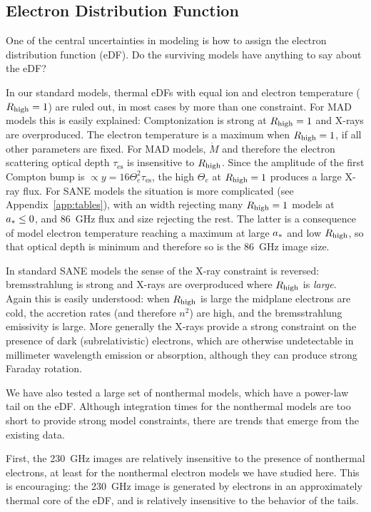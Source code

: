 \subsection{Electron Distribution Function}

One of the central uncertainties in modeling \sgra is how to assign the electron distribution function (eDF).  Do the surviving models have anything to say about the eDF?

In our standard models, thermal eDFs with equal ion and electron temperature ($R_\mathrm{high} = 1$) are ruled out, in most cases by more than one constraint.  For MAD models this is easily explained: Comptonization is strong at $R_\mathrm{high} = 1$ and X-rays are overproduced.  The electron temperature is a maximum when $R_\mathrm{high} = 1$, if all other parameters are fixed. For MAD models, $\dot{M}$ and therefore the electron scattering optical depth $\tau_\mathrm{es}$ is insensitive to $R_\mathrm{high}$.  Since the amplitude of the first Compton bump is $\propto y = 16 \Theta_e^2 \tau_\mathrm{es}$, the high $\Theta_e$ at $R_\mathrm{high} = 1$ produces a large X-ray flux.  For SANE models the situation is more complicated (see Appendix~\ref{app:tables}), with an \mring width rejecting many $R_\mathrm{high} = 1$ models at $a_* \le 0$, and 86~GHz flux and size rejecting the rest.  The latter is a consequence of model electron temperature reaching a maximum at large $a_*$ and low $R_\mathrm{high}$, so that optical depth is minimum and therefore so is the 86~GHz image size.

In standard SANE models the sense of the X-ray constraint is reversed: bremsstrahlung is strong and X-rays are overproduced where $R_\mathrm{high}$ is {\em large}.  Again this is easily understood: when $R_\mathrm{high}$ is large the midplane electrons are cold, the accretion rates (and therefore $n^2$) are high, and the bremsstrahlung emissivity is large.  More generally the X-rays provide a strong constraint on the presence of dark (subrelativistic) electrons, which are otherwise undetectable in millimeter wavelength emission or absorption, although they can produce strong Faraday rotation.

We have also tested a large set of nonthermal models, which have a power-law tail on the eDF.  Although integration times for the nonthermal models are too short to provide strong model constraints, there are trends that emerge from the existing data.

First, the 230~GHz images are relatively insensitive to the presence of nonthermal electrons, at least for the nonthermal electron models we have studied here.  This is encouraging: the 230~GHz image is generated by electrons in an approximately thermal core of the eDF, and is relatively insensitive to the behavior of the tails.

